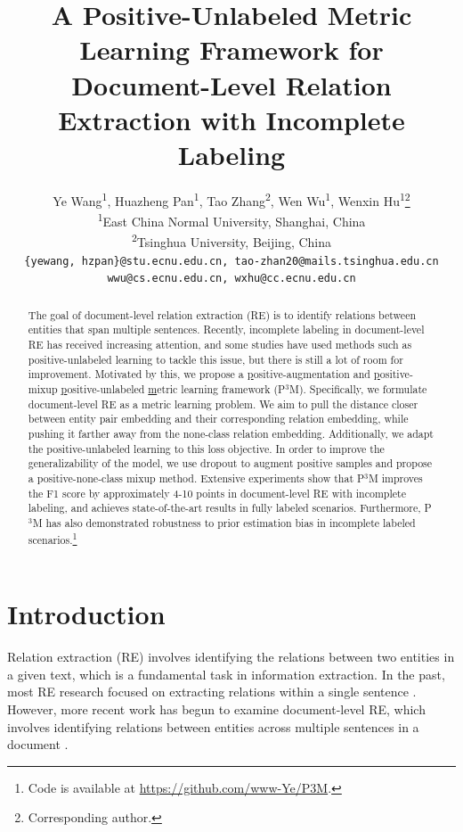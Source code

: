 \documentclass[11pt]{article}
\title{A Positive-Unlabeled Metric Learning Framework for Document-Level Relation Extraction with Incomplete Labeling}
\author{Ye Wang\textsuperscript{1}, Huazheng Pan\textsuperscript{1}, Tao Zhang\textsuperscript{2}, Wen Wu\textsuperscript{1}, Wenxin Hu\textsuperscript{1}\thanks{\enspace Corresponding author.} \\
  \textsuperscript{1}East China Normal University, Shanghai, China\\
  \textsuperscript{2}Tsinghua University, Beijing, China\\
  \texttt{\{yewang, hzpan\}@stu.ecnu.edu.cn, tao-zhan20@mails.tsinghua.edu.cn}\\
  \texttt{wwu@cs.ecnu.edu.cn, wxhu@cc.ecnu.edu.cn}}
\begin{document}
\maketitle
\begin{abstract}
The goal of document-level relation extraction (RE) is to identify relations between entities that span multiple sentences. Recently, incomplete labeling in document-level RE has received increasing attention, and some studies have used methods such as positive-unlabeled learning to tackle this issue, but there is still a lot of room for improvement. Motivated by this, we propose a \underline{p}ositive-augmentation and \underline{p}ositive-mixup \underline{p}ositive-unlabeled \underline{m}etric learning framework (P$^{3}$M). Specifically, we formulate document-level RE as a metric learning problem. We aim to pull the distance closer between entity pair embedding and their corresponding relation embedding, while pushing it farther away from the none-class relation embedding. Additionally, we adapt the positive-unlabeled learning to this loss objective. In order to improve the generalizability of the model, we use dropout to augment positive samples and propose a positive-none-class mixup method. Extensive experiments show that P$^{3}$M improves the F1 score by approximately 4-10 points in document-level RE with incomplete labeling, and achieves state-of-the-art results in fully labeled scenarios. Furthermore, P$^{3}$M has also demonstrated robustness to prior estimation bias in incomplete labeled scenarios.\footnote{Code is available at \url{https://github.com/www-Ye/P3M}.}
\end{abstract}
\section{Introduction}

Relation extraction (RE) involves identifying the relations between two entities in a given text, which is a fundamental task in information extraction. In the past, most RE research focused on extracting relations within a single sentence \citep{miwa-bansal-2016-end, zhang-etal-2018-graph}. However, more recent work has begun to examine document-level RE, which involves identifying relations between entities across multiple sentences in a document \citep{yao-etal-2019-docred, Zhou_Huang_Ma_Huang_2021,xu-etal-2022-document,yu-etal-2022-relation,ijcai2022p630}.
\end{document}
